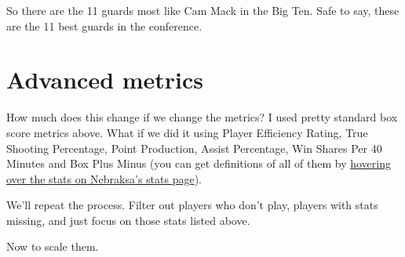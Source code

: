 \documentclass[
]{book}
\newenvironment{Shaded}{\begin{snugshade}}{\end{snugshade}}
\newcommand{\DataTypeTok}[1]{\textcolor[rgb]{0.13,0.29,0.53}{#1}}
\newcommand{\DecValTok}[1]{\textcolor[rgb]{0.00,0.00,0.81}{#1}}
\newcommand{\KeywordTok}[1]{\textcolor[rgb]{0.13,0.29,0.53}{\textbf{#1}}}
\newcommand{\NormalTok}[1]{#1}
\newcommand{\OperatorTok}[1]{\textcolor[rgb]{0.81,0.36,0.00}{\textbf{#1}}}
\newcommand{\StringTok}[1]{\textcolor[rgb]{0.31,0.60,0.02}{#1}}
\begin{document}
So there are the 11 guards most like Cam Mack in the Big Ten. Safe to say, these are the 11 best guards in the conference.

\hypertarget{advanced-metrics}{%
\section{Advanced metrics}\label{advanced-metrics}}

How much does this change if we change the metrics? I used pretty standard box score metrics above. What if we did it using Player Efficiency Rating, True Shooting Percentage, Point Production, Assist Percentage, Win Shares Per 40 Minutes and Box Plus Minus (you can get definitions of all of them by \href{https://www.sports-reference.com/cbb/schools/nebraska/2020.html}{hovering over the stats on Nebraksa's stats page}).

We'll repeat the process. Filter out players who don't play, players with stats missing, and just focus on those stats listed above.

\begin{Shaded}
\end{Shaded}

Now to scale them.

\begin{Shaded}
\end{Shaded}
\end{document}
